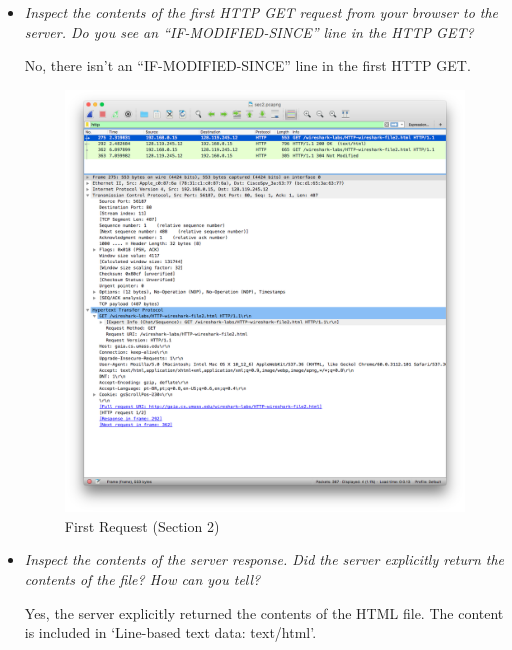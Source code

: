 \documentclass[11pt]{article}
\begin{document}
\begin{itemize}
	\setlength\itemsep{.5cm}

	\item
		\textit{Inspect the contents of the first HTTP GET request from your browser to the server. Do
you see an “IF-MODIFIED-SINCE” line in the HTTP GET?}
		\par No, there isn't an “IF-MODIFIED-SINCE” line in the first HTTP GET.
		
		\begin{figure}[H]
		\centering
		\caption{First Request (Section 2)}
		\includegraphics[width=\textwidth]{02-request_1}
		\end{figure}
		
	\item
		\textit{Inspect the contents of the server response. Did the server explicitly return the contents
of the file? How can you tell?}
		\par Yes, the server explicitly returned the contents of the HTML file. The content is included in `Line-based text data: text/html'.
		

\end{itemize}
\end{document}
